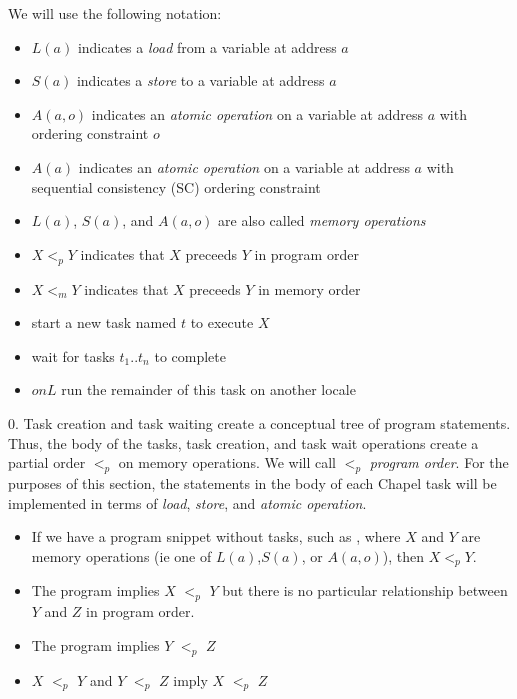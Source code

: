 We will use the following notation:
\begin{itemize}
  \item $L(a)$ indicates a \textit{load} from a variable at address $a$
  \item $S(a)$ indicates a \textit{store} to a variable at address $a$
  \item $A(a,o)$ indicates an \textit{atomic operation} on a variable at address $a$ with ordering constraint $o$
  \item $A(a)$ indicates an \textit{atomic operation} on a variable at address $a$ with sequential consistency (SC) ordering constraint
  \item $L(a)$, $S(a)$, and $A(a,o)$ are also called \textit{memory operations}
  \item $X <_p Y$ indicates that $X$ preceeds $Y$ in program order
  \item $X <_m Y$ indicates that $X$ preceeds $Y$ in memory order
  \item {} start a new task named $t$ to execute $X$
  \item {} wait for tasks $t_1..t_n$ to complete
  \item $on L$ run the remainder of this task on another locale
\end{itemize}

0. Task creation and task waiting create a conceptual tree of program
statements. Thus, the body of the tasks, task creation, and task wait
operations create a partial order $<_p$ on memory operations. We will call
$<_p$ \textit{program order}. For the purposes of this section, the statements
in the body of each Chapel task will be implemented in terms of \textit{load},
\textit{store}, and \textit{atomic operation}.

\begin{itemize}
  \item If we have a program snippet without tasks, such as , where $X$ and $Y$ are memory operations (ie one of $L(a)$,$S(a)$, or $A(a,o)$), then $X <_p Y$.
  \item The program  implies $X$ $<_p$ $Y$ but there is no particular relationship between $Y$ and $Z$ in program order.
  \item The program  implies $Y$ $<_p$ $Z$
  \item $X$ $<_p$ $Y$ and $Y$ $<_p$ $Z$ imply $X$ $<_p$ $Z$
\end{itemize}

